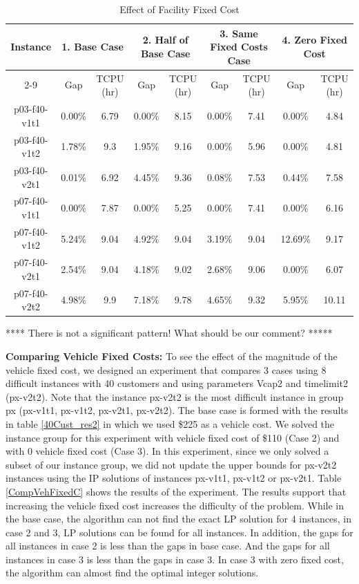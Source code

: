\begin{table}[h!tbp]
\centering
\caption{Effect of Facility Fixed Cost}\label{CompFacFixedC}
\begin {tabular}[t]{|c|c|c|c|c|c|c|c|c|}  
\hline 
Instance & \multicolumn{2}{|c|}{1. Base Case} &  \multicolumn{2}{|c|}{2. Half of Base Case}	&  \multicolumn{2}{|c|}{3. Same Fixed Costs Case}	&  \multicolumn{2}{|c|}{4. Zero Fixed Cost} \\\cline{2-9}			
\mbox{} & Gap &	TCPU (hr)	& Gap &	TCPU (hr)	& Gap & TCPU (hr)	& Gap & TCPU (hr)\\\hline
p03-f40-v1t1	&	0.00\%	&	6.79	&	0.00\%	&	8.15	&       0.00\%	&	7.41	&	0.00\%	&	4.84	\\
p03-f40-v1t2	&	1.78\%	&	9.3	&	1.95\%	&	9.16	&	0.00\%	&	5.96	&	0.00\%	&	4.81	\\
p03-f40-v2t1	&	0.01\%	&	6.92	&	4.45\%	&	9.36	&	0.08\%	&	7.53	&	0.44\%	&	7.58	\\
p07-f40-v1t1	&	0.00\%	&	7.87	&	0.00\%	&	5.25	&	0.00\%	&	7.41	&	0.00\%	&	6.16	\\
p07-f40-v1t2	&	5.24\%	&	9.04	&	4.92\%	&	9.04	&	3.19\%	&	9.04	&	12.69\%	&	9.17	\\
p07-f40-v2t1	&	2.54\%	&	9.04	&	4.18\%	&	9.02	&	2.68\%	&	9.06	&	0.00\%	&	6.07	\\
p07-f40-v2t2	&	4.98\%	&	9.9	&	7.18\%	&	9.78	&	4.65\%	&	9.32	&	5.95\%	&	10.11	\\\hline
\end{tabular}
\end{table}  

**** There is not a significant pattern! What should be our comment? *****

{\bf Comparing Vehicle Fixed Costs:} To see the effect of the magnitude of the vehicle fixed cost,
we designed an experiment that compares 3 cases using 8 difficult instances with 40 customers and using 
parameters Vcap2 and timelimit2 (px-v2t2). Note that the instance px-v2t2 is the most difficult instance
in group px (px-v1t1, px-v1t2, px-v2t1, px-v2t2). The base case is formed with the results in table
\ref{40Cust_res2} in which we used \$225 as a vehicle cost. We solved the instance group
for this experiment with vehicle fixed cost of \$110 (Case 2) and with 0 vehicle fixed cost
(Case 3).  In this experiment, since we only solved a subset of our instance group, 
we did not update the upper bounds for px-v2t2 instances using the IP solutions
of instances px-v1t1, px-v1t2 or px-v2t1.  
 Table \ref{CompVehFixedC} shows the results of the experiment. The results support that
increasing the vehicle fixed cost increases the difficulty of the problem. While in the base case,
the algorithm can not find the exact LP solution for 4 instances, in case 2 and 3, LP solutions can be 
found for all instances. In addition, the gaps for all instances in case 2 is less than the gaps in
base case. And the gaps for all instances in case 3 is less than the gaps in
case 3. In case 3 with zero fixed cost, the algorithm can almost find the optimal integer
solutions.  


